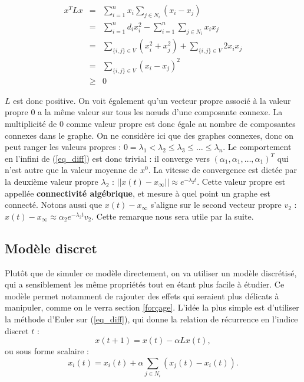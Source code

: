 \documentclass[12pt]{article}
\begin{document}
\begin{eqnarray*}
 x^T L x & = & \sum_{i = 1}^n x_i \sum_{j \in N_i} (x_i - x_j) \\
 & = & \sum_{i = 1}^n d_i x_i^2 - \sum_{i = 1}^n \sum_{j \in N_i} x_i x_j \\
 & = & \sum_{\{i, j\} \in V} (x_i^2 + x_j^2) + \sum_{\{i, j\} \in V} 2 x_i x_j \\
 & = & \sum_{\{i, j\} \in V} (x_i - x_j)^2 \\
 & \geq & 0
\end{eqnarray*}

$L$ est donc positive. On voit également qu'un vecteur propre associé
à la valeur propre $0$ a la même valeur sur tous les n\oe uds d'une
composante connexe. La multiplicité de $0$ comme valeur propre est
donc égale au nombre de composantes connexes dans le graphe. On ne
considère ici que des graphes connexes, donc on peut ranger les
valeurs propres : $0 = \lambda_1 < \lambda_2 \leq \lambda_3 \leq \dots
\leq \lambda_n$. Le comportement en l'infini de (\ref{eq_diff}) est
donc trivial : il converge vers $(\alpha_1, \alpha_1, \dots,
\alpha_1)^T$ qui n'est autre que la valeur moyenne de $x^0$. La
vitesse de convergence est dictée par la deuxième valeur propre
$\lambda_2$ : $||x(t) - x_\infty|| \approx e^{-\lambda_2 t}$. Cette
valeur propre est appellée {\bf connectivité algébrique}, et mesure à
quel point un graphe est connecté. Notons aussi que $x(t) - x_\infty$
s'aligne sur le second vecteur propre $v_2$ : $x(t) - x_\infty \approx
\alpha_2 e^{-\lambda_2 t} v_2$. Cette remarque nous sera utile par la
suite.

\subsection{Modèle discret}
\label{mod_discret}
Plutôt que de simuler ce modèle directement, on va utiliser un modèle
discrétisé, qui a sensiblement les même propriétés tout en étant plus
facile à étudier. Ce modèle permet notamment de rajouter des effets
qui seraient plus délicats à manipuler, comme on le verra section
\ref{forçage}. L'idée la plus simple est d'utiliser la méthode d'Euler
sur (\ref{eq_diff}), qui donne la relation de récurrence en l'indice
discret $t$ :
\begin{equation}
 \label{eq_discrete}
 x(t+1) = x(t) - \alpha L x(t),
\end{equation}
ou sous forme scalaire :
\begin{equation}
 \label{eq_discrete_scal}
 x_i(t) = x_i(t) + \alpha \sum_{j \in N_i} (x_j(t) - x_i(t)).
\end{equation}
\end{document}
